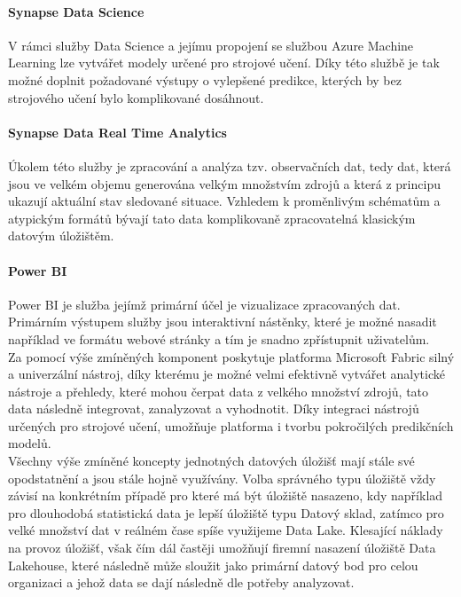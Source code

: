 \documentclass[
  digital,     %
  twoside,     %
  lof,         %
  lot,         %
]{fithesis4}
\begin{document}
\paragraph{Synapse Data Science}
V rámci služby Data Science a jejímu propojení se službou Azure Machine Learning lze vytvářet modely určené pro strojové učení. Díky této službě je tak možné doplnit požadované výstupy o vylepšené predikce, kterých by bez strojového učení bylo komplikované dosáhnout.\parencite{DataScience}

\paragraph{Synapse Data Real Time Analytics}
Úkolem této služby je zpracování a analýza tzv. observačních dat, tedy dat, která jsou ve velkém objemu generována velkým množstvím zdrojů a která z principu ukazují aktuální stav sledované situace. Vzhledem k proměnlivým schématům a atypickým formátů bývají tato data komplikovaně zpracovatelná klasickým datovým úložištěm.\parencite{RealTimeAnalytics}

\paragraph{Power BI}
Power BI je služba jejímž primární účel je vizualizace zpracovaných dat. Primárním výstupem služby jsou interaktivní nástěnky, které je možné nasadit například ve formátu webové stránky a tím je snadno zpřístupnit uživatelům.\parencite{PowerBi}\\

Za pomocí výše zmíněných komponent poskytuje platforma Microsoft Fabric silný a univerzální nástroj, díky kterému je možné velmi efektivně vytvářet analytické nástroje a přehledy, které mohou čerpat data z velkého množství zdrojů, tato data následně integrovat, zanalyzovat a vyhodnotit. Díky integraci nástrojů určených pro strojové učení, umožňuje platforma i tvorbu pokročilých predikčních modelů.\\

Všechny výše zmíněné koncepty jednotných datových úložišť mají stále své opodstatnění a jsou stále hojně využívány. Volba správného typu úložiště vždy závisí na konkrétním případě pro které má být úložiště nasazeno, kdy například pro dlouhodobá statistická data je lepší úložiště typu Datový sklad, zatímco pro velké množství dat v reálném čase spíše využijeme Data Lake. Klesající náklady na provoz úložišť, však čím dál častěji umožňují firemní nasazení úložiště Data Lakehouse, které následně může sloužit jako primární datový bod pro celou organizaci a jehož data se dají následně dle potřeby analyzovat.
\end{document}
